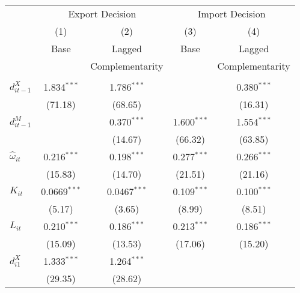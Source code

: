 \begin{center}
\begin{tabular}{l*{4}{c}}
\hline\hline&\multicolumn{2}{c}{Export
              Decision}&\multicolumn{2}{c}{Import Decision}\\
            &\multicolumn{1}{c}{(1)}&\multicolumn{1}{c}{(2)}&\multicolumn{1}{c}{(3)}&\multicolumn{1}{c}{(4)}\\
            &\multicolumn{1}{c}{Base}&\multicolumn{1}{c}{Lagged}&\multicolumn{1}{c}{Base}&\multicolumn{1}{c}{Lagged}\\
&\multicolumn{1}{c}{}&\multicolumn{1}{c}{Complementarity}&\multicolumn{1}{c}{}&\multicolumn{1}{c}{Complementarity}\\
\hline
        &                     &                     &                     &                     \\
$d_{it-1}^{X}$      &       1.834$^{***}$&       1.786$^{***}$&                     &       0.380$^{***}$\\
            &     (71.18)         &     (68.65)         &                           &     (16.31)         \\
[1em]
$d_{it-1}^{M}$      &                     &       0.370$^{***}$&       1.600$^{***}$&       1.554$^{***}$\\
            &                     &     (14.67)         &     (66.32)         &     (63.85)         \\
[1em]
$\hat{\omega}_{it}$       &       0.216$^{***}$&       0.198$^{***}$&       0.277$^{***}$&       0.266$^{***}$\\
            &     (15.83)         &     (14.70)         &     (21.51)         &     (21.16)         \\
[1em]
$K_{it}$        &      0.0669$^{***}$&      0.0467$^{***}$&       0.109$^{***}$&       0.100$^{***}$\\
            &      (5.17)         &      (3.65)         &      (8.99)         &      (8.51)         \\
[1em]
$L_{it}$     &       0.210$^{***}$&       0.186$^{***}$&       0.213$^{***}$&       0.186$^{***}$\\
            &     (15.09)         &     (13.53)         &     (17.06)         &     (15.20)         \\
[1em]
$d_{i1}^{X}$     &       1.333$^{***}$&       1.264$^{***}$&                     &                     \\
            &     (29.35)         &     (28.62)         &                     &                     \\

\end{tabular}
\end{center}
